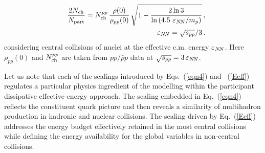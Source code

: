 \documentclass[twocolumn,showpacs,preprintnumbers,prd,superscriptaddress,nofootinbib]{revtex4}
\begin{document}
\begin{eqnarray}
& &
\nonumber
\frac{2N_{\rm{ch}}}{N_{\rm{part}}}  =
  N^{pp}_{\rm ch} \,
   \frac{\rho(0)}{\rho_{pp}(0)} \,
  \sqrt{1-\frac{2 \ln 3}{\ln\, (4.5\ \varepsilon_{N\!N} /m_ p)}}\,,  \\
& &    \varepsilon_{N\!N}=\sqrt{s_{pp}}/3 \, .
  \label{pmultc}
\end{eqnarray}
  \nopar
 considering
 central 
collisions of nuclei
  at 
 the effective c.m.  energy 
 $\varepsilon_{N\!N}$. Here
 $\rho_{pp}(0)$ 
 and 
 $N_{\rm{ch}}^{pp}$  
 are
 taken 
 from  $pp/{\bar p}p$ 
 data
 at  $\sqrt{s_{pp}}=3\, \varepsilon_{N\!N}$.
 

Let us note that each of the scalings introduced by  Eqs.~(\ref{eqn4}) and 
~(\ref{Eeff}) 
regulates a particular physics ingredient 
 of the
 modelling within the 
participant dissipative effective-energy  
approach. The scaling embedded in Eq.~(\ref{eqn4}) reflects the 
constituent 
quark picture and then reveals a similarity of multihadron 
production in hadronic and 
nuclear collisions. The scaling driven by Eq.~(\ref{Eeff}) addresses the 
energy budget effectively retained in the most central collisions while 
defining the energy availability for the global variables in non-central 
collisions.

\end{document}
